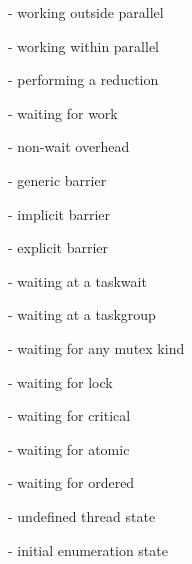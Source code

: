 \descr
\label{ompd_state_work_serial}
 - 
working outside parallel
 
\label{ompd_state_work_parallel}
 - 
working within parallel

\label{ompd_state_work_reduction}
 - 
performing a reduction

\label{ompd_state_idle}
 - 
waiting for work
 
\label{ompd_state_overhead}
 - 
non-wait overhead

\label{ompd_state_wait_barrier}
 - 
generic barrier

\label{ompd_state_wait_barrier_implicit}
 - 
implicit barrier

\label{ompd_state_wait_barrier_explicit}
 - 
explicit barrier

\label{ompd_state_wait_taskwait}
 - 
waiting at a taskwait

\label{ompd_state_wait_taskgroup}
 - 
waiting at a taskgroup

\label{ompd_state_wait_mutex}
 - 
waiting for any mutex kind

\label{ompd_state_wait_lock}
 - 
waiting for lock

\label{ompd_state_wait_critical}
 - 
waiting for critical

\label{ompd_state_wait_atomic}
 - 
waiting for atomic

\label{ompd_state_wait_ordered}
 - 
waiting for ordered

\label{ompd_state_undefined}
 - 
undefined thread state

\label{ompd_state_first}
 - 
initial enumeration state
